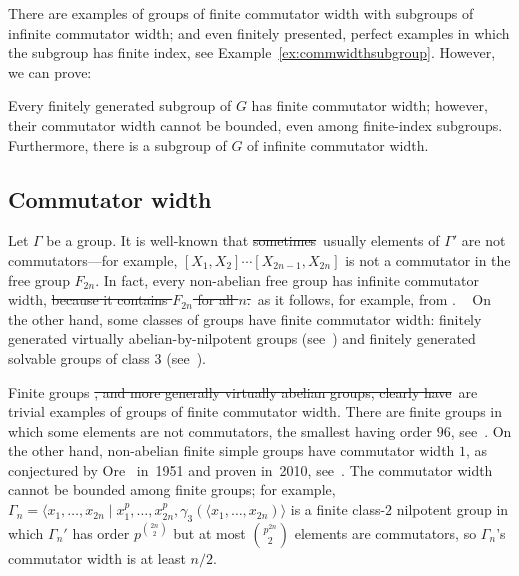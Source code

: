 \documentclass[a4paper,11pt]{amsart}
\newcommand\replace[2]{\st{#1}{\color{Green4}\ #2}}
\begin{document}
There are examples of groups of finite commutator width with subgroups
of infinite commutator width; and even finitely presented, perfect
examples in which the subgroup has finite index, see
Example~\ref{ex:commwidthsubgroup}. However, we can prove:
\begin{thma}\label{thm:subgroups}
  Every finitely generated subgroup of $G$ has finite commutator
  width; however, their commutator width cannot be bounded, even among
  finite-index subgroups. Furthermore, there is a subgroup of $G$ of infinite commutator width.
\end{thma}

\subsection{Commutator width}
Let $\Gamma$ be a group. It is well-known that \replace{sometimes}{usually} elements of
$\Gamma'$ are not commutators---for example,
$[X_1,X_2]\cdots[X_{2n-1},X_{2n}]$ is not a commutator in the free
group $F_{2n}$. In fact, every non-abelian free group has infinite
commutator width, 
\replace{because it contains $F_{2n}$ for all $n$.}
{as it follows, for example, from \cite{Culler:Surfaces}.}%
 \replace{}{%
On the other hand, some classes of groups have finite commutator width: finitely generated virtually abelian-by-nilpotent groups 
(see~\cite{Segal:Words}) and finitely generated solvable groups of class $3$ (see~\cite{Rhemtulla:Commutators}).
}

Finite groups \replace{, and more generally virtually abelian groups, clearly have}
{are trivial examples of groups of}
finite commutator width.  There are finite groups in which some
elements are not commutators, the smallest having order $96$,
see~\cite{Guralnick:Group96}. On the other hand, non-abelian finite
simple groups have commutator width $1$, as conjectured by
Ore~\cite{Ore:Commutators} in~1951 and proven in~2010,
see~\cite{Liebeck:OreConjecture}. The commutator width cannot be
bounded among finite groups; for example,
$\Gamma_n=\langle x_1,\dots,x_{2n}\mid
x_1^p,\dots,x_{2n}^p,\gamma_3(\langle x_1,\dots,x_{2n})\rangle$ is a
finite class-$2$ nilpotent group in which $\Gamma_n'$ has order
$p^{\binom{2n}2}$ but at most $\binom{p^{2n}}2$ elements are
commutators, so $\Gamma_n$'s commutator width is at least $n/2$.
\end{document}
